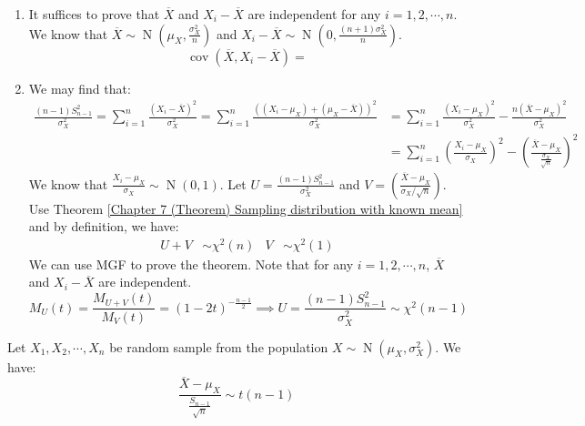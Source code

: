 \documentclass{huhtakm-template-book}
\DeclareMathOperator{\N}{N}
\DeclareMathOperator{\cov}{cov}
\begin{document}
\begin{proofing}
	\begin{enumerate}
		\item It suffices to prove that $\overline{X}$ and $X_{i}-\overline{X}$ are independent for any $i=1,2,\cdots,n$.\\
		We know that $\overline{X}\sim\N(\mu_{X},\frac{\sigma_{X}^{2}}{n})$ and $X_{i}-\overline{X}\sim\N(0,\frac{(n+1)\sigma_{X}^{2}}{n})$.
		\begin{equation*}
			\cov(\overline{X},X_{i}-\overline{X})=
		\end{equation*}
		\item We may find that:
		\begin{align*}
			\frac{(n-1)S_{n-1}^{2}}{\sigma_{X}^{2}}=\sum_{i=1}^{n}\frac{(X_{i}-\overline{X})^{2}}{\sigma_{X}^{2}}=\sum_{i=1}^{n}\frac{((X_{i}-\mu_{X})+(\mu_{X}-\overline{X}))^{2}}{\sigma_{X}^{2}}&=\sum_{i=1}^{n}\frac{(X_{i}-\mu_{X})^{2}}{\sigma_{X}^{2}}-\frac{n(\overline{X}-\mu_{X})^{2}}{\sigma_{X}^{2}}\\
			&=\sum_{i=1}^{n}\left(\frac{X_{i}-\mu_{X}}{\sigma_{X}}\right)^{2}-\left(\frac{\overline{X}-\mu_{X}}{\frac{\sigma_{X}}{\sqrt{n}}}\right)^{2}
		\end{align*}
		We know that $\frac{X_{i}-\mu_{X}}{\sigma_{X}}\sim\N(0,1)$. Let $U=\frac{(n-1)S_{n-1}^{2}}{\sigma_{X}^{2}}$ and $V=\left(\frac{\overline{X}-\mu_{X}}{\sigma_{X}/\sqrt{n}}\right)$. Use Theorem \ref{Chapter 7 (Theorem) Sampling distribution with known mean} and by definition, we have:
		\begin{align*}
			U+V&\sim\chi^{2}(n) & V&\sim\chi^{2}(1)
		\end{align*} 
		We can use MGF to prove the theorem. Note that for any $i=1,2,\cdots,n$, $\overline{X}$ and $X_{i}-\overline{X}$ are independent.
		\begin{equation*}
			M_{U}(t)=\frac{M_{U+V}(t)}{M_{V}(t)}=(1-2t)^{-\frac{n-1}{2}}\implies U=\frac{(n-1)S_{n-1}^{2}}{\sigma_{X}^{2}}\sim\chi^{2}(n-1)
		\end{equation*}
	\end{enumerate}
\end{proofing}
\begin{thm}
	Let $X_{1},X_{2},\cdots,X_{n}$ be random sample from the population $X\sim\N(\mu_{X},\sigma_{X}^{2})$. We have:
	\begin{equation*}
		\frac{\overline{X}-\mu_{X}}{\frac{S_{n-1}}{\sqrt{n}}}\sim t(n-1)
	\end{equation*}
\end{thm}
\end{document}
